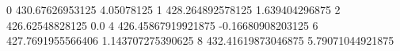 0 430.67626953125 4.05078125
1 428.264892578125 1.639404296875
2 426.62548828125 0.0
4 426.45867919921875 -0.16680908203125
6 427.7691955566406 1.143707275390625
8 432.41619873046875 5.79071044921875
